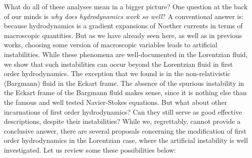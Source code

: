 \documentclass[superscriptaddress,prd,nofootinbib,preprintnumbers,longbibliography,11pt,eqsecnum]{revtex4-1}
\begin{document}
What do all of these analyses mean in a bigger picture? One question at the back of our minds is \textit{why does hydrodynamics work so well}? A conventional answer is: because hydrodynamics is a gradient expansions of Noether currents in terms of macroscopic quantities. But as we have already seen here, as well as in previous works, choosing some version of macroscopic variables leads to artificial instabilities. While these phenomena are well-documented in the Lorentzian fluid, we show that such instabilities can occur beyond the Lorentzian fluid in first order hydrodynamics. The exception that we found is in the non-relativistic (Bargmann) fluid in the Eckart frame. The absence of the spurious instability in the Eckart frame of the Bargmann fluid makes sense, since it is nothing else than the famous and well tested Navier-Stokes equations. But what about other incarnations of first order hydrodynamics? Can they still serve as good effective descriptions, despite their instabilities? While we, regrettably, cannot provide a conclusive answer, there are several proposals concerning the modification of first order hydrodynamics in the Lorentzian case, where the artificial instability is well investigated. Let us review some these possibilities below: 
\end{document}
